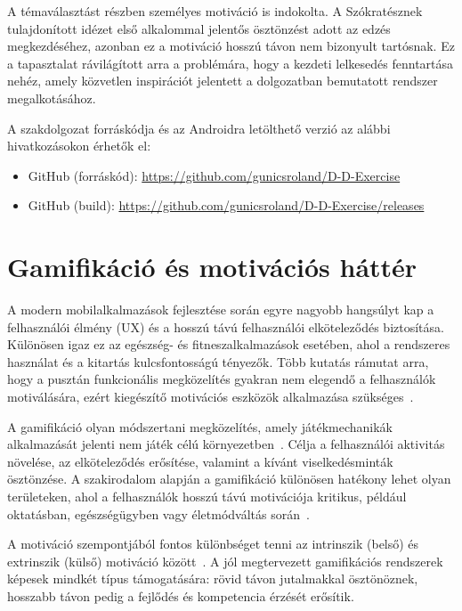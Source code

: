 \documentclass[
]{thesis-ekf}
\theoremstyle{definition}
\theoremstyle{remark}
\begin{document}
A témaválasztást részben személyes motiváció is indokolta. A Szókratésznek tulajdonított idézet első alkalommal jelentős ösztönzést adott az edzés megkezdéséhez, azonban ez a motiváció hosszú távon nem bizonyult tartósnak. Ez a tapasztalat rávilágított arra a problémára, hogy a kezdeti lelkesedés fenntartása nehéz, amely közvetlen inspirációt jelentett a dolgozatban bemutatott rendszer megalkotásához.

A szakdolgozat forráskódja és az Androidra letölthető verzió az alábbi hivatkozásokon érhetők el:

\begin{itemize}
    \item GitHub (forráskód): \url{https://github.com/gunicsroland/D-D-Exercise}
    \item GitHub (build): \url{https://github.com/gunicsroland/D-D-Exercise/releases}
\end{itemize}

\chapter{Gamifikáció és motivációs háttér}

A modern mobilalkalmazások fejlesztése során egyre nagyobb hangsúlyt kap a felhasználói élmény (UX) és a hosszú távú felhasználói elköteleződés biztosítása. Különösen igaz ez az egészség- és fitneszalkalmazások esetében, ahol a rendszeres használat és a kitartás kulcsfontosságú tényezők. Több kutatás rámutat arra, hogy a pusztán funkcionális megközelítés gyakran nem elegendő a felhasználók motiválására, ezért kiegészítő motivációs eszközök alkalmazása szükséges~\cite{hamari2014does}.

A gamifikáció olyan módszertani megközelítés, amely játékmechanikák alkalmazását jelenti nem játék célú környezetben~\cite{deterding2011gamification}. Célja a felhasználói aktivitás növelése, az elköteleződés erősítése, valamint a kívánt viselkedésminták ösztönzése. A szakirodalom alapján a gamifikáció különösen hatékony lehet olyan területeken, ahol a felhasználók hosszú távú motivációja kritikus, például oktatásban, egészségügyben vagy életmódváltás során~\cite{hamari2014does}.

A motiváció szempontjából fontos különbséget tenni az intrinszik (belső) és extrinszik (külső) motiváció között~\cite{ryan2000intrinsic}. A jól megtervezett gamifikációs rendszerek képesek mindkét típus támogatására: rövid távon jutalmakkal ösztönöznek, hosszabb távon pedig a fejlődés és kompetencia érzését erősítik.
\end{document}
